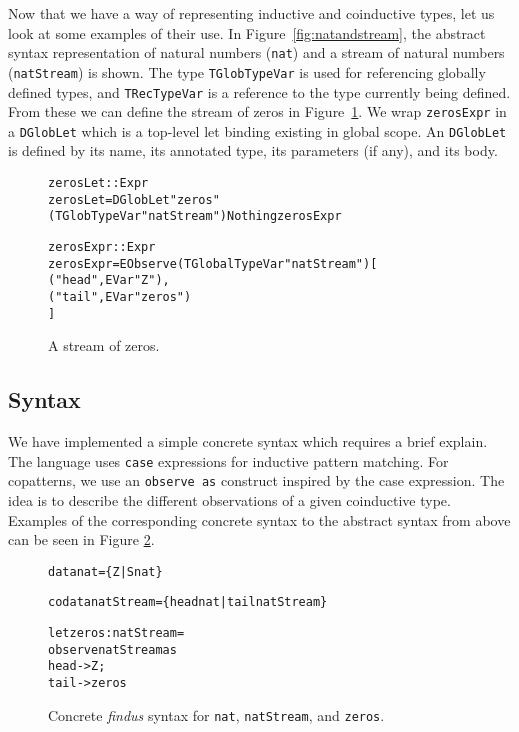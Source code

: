Now that we have a way of representing inductive and coinductive types, let us look at some examples of their use. In Figure~\ref{fig:natandstream}, the abstract syntax representation of natural numbers (\texttt{nat}) and a stream of natural numbers (\texttt{natStream}) is shown. The type \texttt{TGlobTypeVar} is used for referencing globally defined types, and \texttt{TRecTypeVar} is a reference to the type currently being defined. From these we can define the stream of zeros in Figure~\ref{fig:astzeros}. We wrap \texttt{zerosExpr} in a \texttt{DGlobLet} which is a top-level let binding existing in global scope. An \texttt{DGlobLet} is defined by its name, its annotated type, its parameters (if any), and its body.

\begin{figure}
\begin{alltt}
zerosLet :: Expr
zerosLet = DGlobLet "zeros" (TGlobTypeVar "natStream") Nothing zerosExpr

zerosExpr :: Expr
zerosExpr = EObserve (TGlobalTypeVar "natStream") [
            ("head", EVar "Z"),
            ("tail", EVar "zeros")
        ]
\end{alltt}
\caption{A stream of zeros.}
\label{fig:astzeros}
\end{figure}

\subsection{Syntax}
We have implemented a simple concrete syntax which requires a brief explain. The language uses \texttt{case} expressions for inductive pattern matching. For copatterns, we use an \texttt{observe as} construct inspired by the case expression. The idea is to describe the different observations of a given coinductive type. Examples of the corresponding concrete syntax to the abstract syntax from above can be seen in Figure \ref{fig:concrete_syntax}.

\begin{figure}
\begin{alltt}
data nat = \{Z | S nat\}

codata natStream = \{head nat | tail natStream\}

let zeros : natStream =
  observe natStream as
    head -> Z ;
    tail -> zeros
\end{alltt}
\caption{Concrete \textit{findus} syntax for \texttt{nat}, \texttt{natStream}, and \texttt{zeros}.}
\label{fig:concrete_syntax}
\end{figure}

